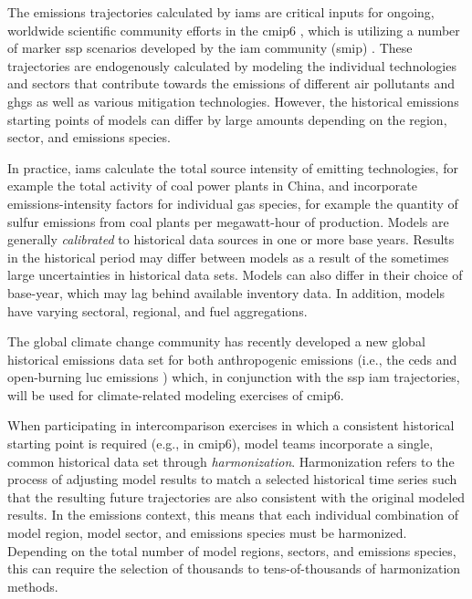 \documentclass[review]{elsarticle}
\begin{document}
The emissions trajectories calculated by \glspl{iam} are critical inputs for
ongoing, worldwide scientific community efforts in the \gls{cmip6}
\cite{eyring_overview_2016}, which is utilizing a number of marker \gls{ssp} scenarios
developed by the \gls{iam} community (\gls{smip})
\cite{oneill_scenario_2016}. These trajectories are endogenously calculated by
modeling the individual technologies and sectors that contribute towards the
emissions of different air pollutants and \glspl{ghg} as well as various
mitigation technologies. However, the historical emissions starting points of
models can differ by large amounts depending on the region, sector, and
emissions species.

In practice, \glspl{iam} calculate the total source intensity of emitting
technologies, for example the total activity of coal power plants in China, and
incorporate emissions-intensity factors for individual gas species, for example
the quantity of sulfur emissions from coal plants per megawatt-hour of
production. Models are generally \textit{calibrated} to historical data sources
in one or more base years. Results in the historical period may differ between
models as a result of the sometimes large uncertainties in historical data
sets. Models can also differ in their choice of base-year, which may lag behind
available inventory data. In addition, models have varying sectoral, regional,
and fuel aggregations.

The global climate change community has recently developed a new global
historical emissions data set for both anthropogenic emissions (i.e., the
\gls{ceds} \cite{hoesly_historical_2017} and open-burning \gls{luc} emissions
\cite{van_marle_historic_2017}) which, in conjunction with the \gls{ssp}
\gls{iam} trajectories, will be used for climate-related modeling exercises of
\gls{cmip6}.

When participating in intercomparison exercises in which a consistent historical
starting point is required (e.g., in \gls{cmip6}), model teams incorporate a single,
common historical data set through \textit{harmonization}. Harmonization
refers to the process of adjusting model results to match a selected
historical time series such that the resulting future trajectories are also
consistent with the original modeled results. In the emissions context, this
means that each individual combination of model region, model sector, and
emissions species must be harmonized. Depending on the total number of model
regions, sectors, and emissions species, this can require the selection of
thousands to tens-of-thousands of harmonization methods.
\end{document}
